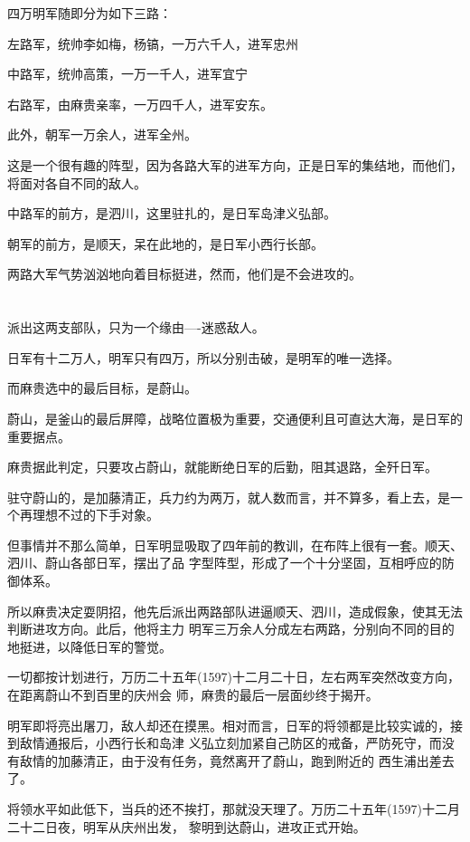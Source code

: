 \documentclass[11pt,a4paper,onecolumn]{article}
\begin{document}
四万明军随即分为如下三路：

左路军，统帅李如梅，杨镐，一万六千人，进军忠州

中路军，统帅高策，一万一千人，进军宜宁

右路军，由麻贵亲率，一万四千人，进军安东。

此外，朝军一万余人，进军全州。

这是一个很有趣的阵型，因为各路大军的进军方向，正是日军的集结地，而他们，将面对各自不同的敌人。

中路军的前方，是泗川，这里驻扎的，是日军岛津义弘部。

朝军的前方，是顺天，呆在此地的，是日军小西行长部。

两路大军气势汹汹地向着目标挺进，然而，他们是不会进攻的。

\section[\thesection]{}

派出这两支部队，只为一个缘由----迷惑敌人。

日军有十二万人，明军只有四万，所以分别击破，是明军的唯一选择。

而麻贵选中的最后目标，是蔚山。

蔚山，是釜山的最后屏障，战略位置极为重要，交通便利且可直达大海，是日军的重要据点。

麻贵据此判定，只要攻占蔚山，就能断绝日军的后勤，阻其退路，全歼日军。

驻守蔚山的，是加藤清正，兵力约为两万，就人数而言，并不算多，看上去，是一个再理想不过的下手对象。

但事情并不那么简单，日军明显吸取了四年前的教训，在布阵上很有一套。顺天、泗川、蔚山各部日军，摆出了品
字型阵型，形成了一个十分坚固，互相呼应的防御体系。

所以麻贵决定耍阴招，他先后派出两路部队进逼顺天、泗川，造成假象，使其无法判断进攻方向。此后，他将主力
明军三万余人分成左右两路，分别向不同的目的地挺进，以降低日军的警觉。

一切都按计划进行，万历二十五年(1597)十二月二十日，左右两军突然改变方向，在距离蔚山不到百里的庆州会
师，麻贵的最后一层面纱终于揭开。

明军即将亮出屠刀，敌人却还在摸黑。相对而言，日军的将领都是比较实诚的，接到敌情通报后，小西行长和岛津
义弘立刻加紧自己防区的戒备，严防死守，而没有敌情的加藤清正，由于没有任务，竟然离开了蔚山，跑到附近的
西生浦出差去了。

将领水平如此低下，当兵的还不挨打，那就没天理了。万历二十五年(1597)十二月二十二日夜，明军从庆州出发，
黎明到达蔚山，进攻正式开始。
\end{document}

